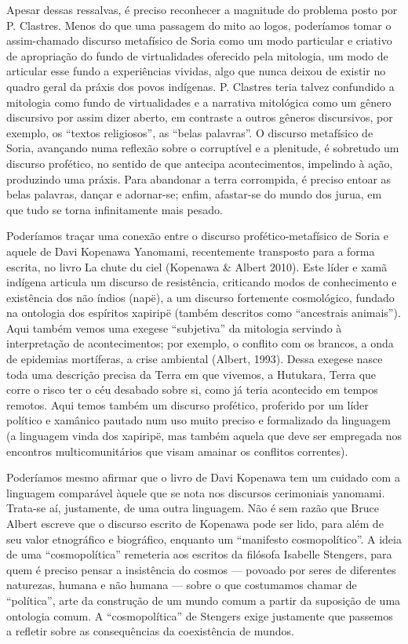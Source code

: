 Apesar dessas ressalvas, é preciso reconhecer a magnitude do problema
posto por P. Clastres. Menos do que uma passagem do mito ao logos,
poderíamos tomar o assim-chamado discurso metafísico de Soria como um
modo particular e criativo de apropriação do fundo de virtualidades
oferecido pela mitologia, um modo de articular esse fundo a
experiências vividas, algo que nunca deixou de existir no quadro geral
da práxis dos povos indígenas. P. Clastres teria talvez confundido a
mitologia como fundo de virtualidades e a narrativa mitológica como um
gênero discursivo por assim dizer aberto, em contraste a outros gêneros
discursivos, por exemplo, os ``textos religiosos'', as ``belas palavras''.
O discurso metafísico de Soria, avançando numa reflexão sobre o
corruptível e a plenitude, é sobretudo um discurso profético, no
sentido de que antecipa acontecimentos, impelindo à ação, produzindo
uma práxis. Para abandonar a terra corrompida, é preciso entoar as
belas palavras, dançar e adornar-se; enfim, afastar-se do mundo dos
jurua, em que tudo se torna infinitamente mais pesado. 

Poderíamos traçar uma conexão entre o discurso profético-metafísico de
Soria e aquele de Davi Kopenawa Yanomami, recentemente transposto para
a forma escrita, no livro La chute du ciel (Kopenawa \& Albert 2010).
Este líder e xamã indígena articula um discurso de resistência,
criticando modos de conhecimento e existência dos não índios (napë), a
um discurso fortemente cosmológico, fundado na ontologia dos espíritos
xapiripë (também descritos como ``ancestrais animais''). Aqui também
vemos uma exegese ``subjetiva'' da mitologia servindo à interpretação de
acontecimentos; por exemplo, o conflito com os brancos, a onda de
epidemias mortíferas, a crise ambiental (Albert, 1993). Dessa exegese
nasce toda uma descrição precisa da Terra em que vivemos, a Hutukara,
Terra que corre o risco ter o céu desabado sobre si, como já teria
acontecido em tempos remotos. Aqui temos também um discurso profético,
proferido por um líder político e xamânico pautado num uso muito
preciso e formalizado da linguagem (a linguagem vinda dos xapiripë, mas
também aquela que deve ser empregada nos encontros multicomunitários
que visam amainar os conflitos correntes). 

Poderíamos mesmo afirmar que o livro de Davi Kopenawa tem um cuidado com
a linguagem comparável àquele que se nota nos discursos cerimoniais
yanomami. Trata-se aí, justamente, de uma outra linguagem. Não é sem
razão que Bruce Albert escreve que o discurso escrito de Kopenawa pode
ser lido, para além de seu valor etnográfico e biográfico, enquanto um
``manifesto cosmopolítico''. A ideia de uma ``cosmopolítica'' remeteria aos
escritos da filósofa Isabelle Stengers, para quem é preciso pensar a
insistência do cosmos — povoado por seres de diferentes naturezas,
humana e não humana — sobre o que costumamos chamar de ``política'', arte
da construção de um mundo comum a partir da suposição de uma ontologia
comum. A ``cosmopolítica'' de Stengers exige justamente que passemos a
refletir sobre as consequências da coexistência de mundos.

